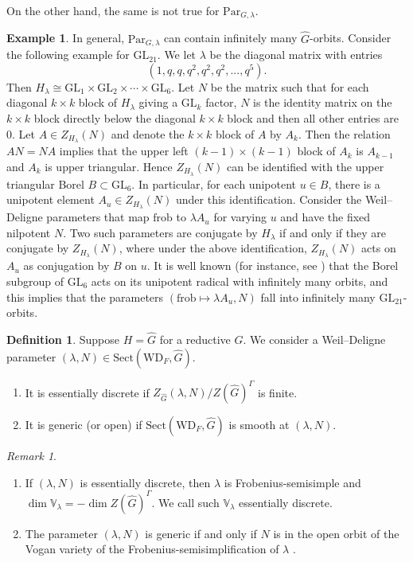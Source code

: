 \documentclass{amsart}
\theoremstyle{definition}
\newtheorem{definition}[theorem]{Definition}
\newtheorem{example}[theorem]{Example}
\theoremstyle{remark}
\newtheorem{remark}[theorem]{Remark}
\numberwithin{equation}{section}
\newcommand{\GL}{\mathrm{GL}}
\newcommand{\wh}{\widehat}
\newcommand{\frob}{\mathrm{frob}}
\newcommand{\Par}{\mathrm{Par}}
\newcommand{\V}{\mathbb{V}}
\newcommand{\WD}{\mathrm{WD}}
\newcommand{\Sect}{\mathrm{Sect}}
\begin{document}
On the other hand, the same is not true for $\Par_{G, \lambda}$.
\begin{example}
    In general, $\Par_{G, \lambda}$ can contain infinitely many $\wh{G}$-orbits. Consider the following example for $\GL_{21}$. We let $\lambda$ be the diagonal matrix with entries
    \begin{equation*}
          (1, q, q, q^{2}, q^{2}, q^{2}, ..., q^{5}).
    \end{equation*}
  Then $H_{\lambda} \cong \GL_1 \times \GL_2 \times \cdots\times \GL_6$. Let $N$ be the matrix such that for each diagonal $k \times k$ block of $H_{\lambda}$ giving a $\GL_k$ factor, $N$ is the identity matrix on the $k \times k$ block directly below the diagonal $k \times k$ block and then all other entries are $0$. Let $A \in Z_{H_{\lambda}}(N)$ and denote the $k \times k$ block of $A$ by $A_k$. Then the relation $AN=NA$ implies that the upper left $(k-1) \times (k-1)$ block of $A_k$ is $A_{k-1}$ and $A_k$ is upper triangular. Hence $Z_{H_{\lambda}}(N)$ can be identified with the upper triangular Borel $B \subset \GL_6$. In particular, for each unipotent $u \in B$, there is a unipotent element $A_u \in Z_{H_{\lambda}}(N)$ under this identification. Consider the Weil--Deligne parameters that map $\frob$ to $\lambda A_u$ for varying $u$ and have the fixed nilpotent $N$. Two such parameters are conjugate by $H_{\lambda}$ if and only if they are conjugate by $Z_{H_{\lambda}}(N)$, where under the above identification,  $Z_{H_{\lambda}}(N)$ acts on $A_u$ as conjugation by $B$ on $u$. It is well known (for instance, see \cite{HilleRohrle}) that the Borel subgroup of $\GL_6$ acts on its unipotent radical with infinitely many orbits, and this implies that the parameters $(\frob \mapsto \lambda A_u , N)$ fall into infinitely many $\GL_{21}$-orbits.
\end{example}

\begin{definition}
Suppose $H=\wh G$ for a reductive $G$. We consider a Weil--Deligne parameter $(\lambda, N)\in \Sect (\WD_F, \wh G)$.  
\begin{enumerate}
    \item It is essentially discrete if $Z_{\wh G}(\lambda, N)/Z(\wh G)^{\Gamma}$ is finite. 
    \item It is generic (or open) if $\Sect(\WD_F, \wh G)$ is smooth at $(\lambda, N)$. 
\end{enumerate}
\end{definition}

\begin{remark}
\begin{enumerate}
    \item If $(\lambda, N)$ is essentially discrete, then $\lambda$ is Frobenius-semisimple and $\dim \V_\lambda =-\dim Z(\wh G)^{\Gamma}$. We call such $\V_{\lambda}$ essentially discrete.
    \item The parameter $(\lambda, N)$ is generic if and only if $N$ is in the open orbit of the Vogan variety of the Frobenius-semisimplification of $\lambda$ \cite[Proposition 6.10]{DHKMllcinfamiliesbanal}.
\end{enumerate}
\end{remark}
\end{document}
